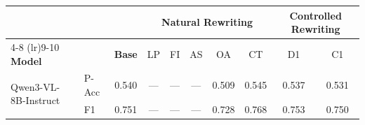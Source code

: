 \begin{tabular}{l l c ccccccc}
\toprule
 & & & \multicolumn{5}{c}{\textbf{Natural Rewriting}} & \multicolumn{2}{c}{\textbf{Controlled Rewriting}} \\
\cmidrule(lr){4-8} \cmidrule(lr){9-10}
\textbf{Model} & & \textbf{Base} & LP & FI & AS & OA & CT & D1 & C1 \\
\midrule
 \multirow{2}{*}{Qwen3-VL-8B-Instruct} & P-Acc & 0.540 & — & — & — & \cellcolor{red!25}0.509 & \cellcolor{green!5}0.545 & \cellcolor{red!5}0.537 & \cellcolor{red!6}0.531 \\
  & F1 & 0.751 & — & — & — & \cellcolor{red!19}0.728 & \cellcolor{green!13}0.768 & \cellcolor{green!5}0.753 & \cellcolor{red!5}0.750 \\
\bottomrule
\end{tabular}